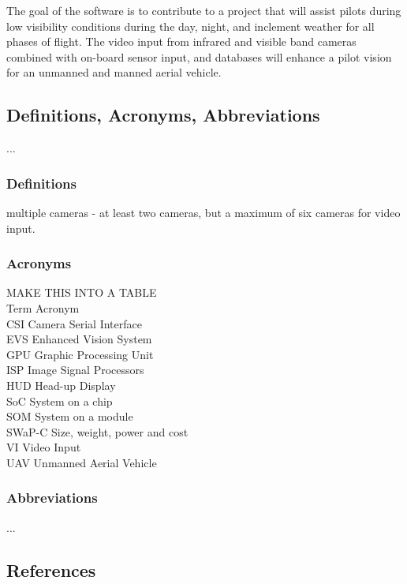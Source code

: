 \documentclass[letterpaper,10pt,serif,draftclsnofoot,onecolumn,compsoc,titlepage]{IEEEtran}
\begin{document}
The goal of the software is to contribute to a project that will assist pilots during 
low visibility conditions during the day, night, and inclement weather for all phases 
of flight. The video input from infrared and visible band cameras combined with 
on-board sensor input, and databases will enhance a pilot vision for an unmanned and 
manned aerial vehicle.\\

\subsection{Definitions, Acronyms, Abbreviations}

...

\subsubsection{Definitions}

multiple cameras - at least two cameras, but a maximum of six cameras for video input.

\subsubsection{Acronyms}

MAKE THIS INTO A TABLE\\
Term
Acronym\\
CSI
Camera Serial Interface\\
EVS
Enhanced Vision System\\
GPU
Graphic Processing Unit\\
ISP
Image Signal Processors\\
HUD
Head-up Display\\
SoC
System on a chip\\
SOM
System on a module\\
SWaP-C
Size, weight, power and cost\\
VI
Video Input\\
UAV
Unmanned Aerial Vehicle\\

\subsubsection{Abbreviations}

...

\subsection{References}
\end{document}
